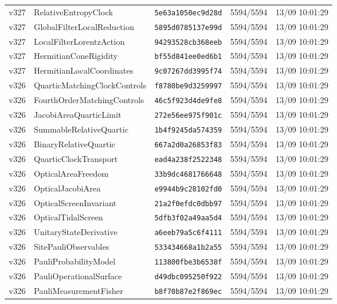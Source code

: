 \documentclass[11pt]{article}
\theoremstyle{definition}\newtheorem{deriv}{Derivation}
\begin{document}
{\begin{longtable}{@{}lllll@{}}
v327 & RelativeEntropyClock & \texttt{5e63a1050ec9d28d} & 5594/5594 & 13/09 10:01:29 \\
v327 & GlobalFilterLocalReduction & \texttt{5895d0785137e99d} & 5594/5594 & 13/09 10:01:29 \\
v327 & LocalFilterLorentzAction & \texttt{94293528cb368eeb} & 5594/5594 & 13/09 10:01:29 \\
v327 & HermitianConeRigidity & \texttt{bf55d841ee0ed6b1} & 5594/5594 & 13/09 10:01:29 \\
v327 & HermitianLocalCoordinates & \texttt{9c07267dd3995f74} & 5594/5594 & 13/09 10:01:29 \\
v326 & QuarticMatchingClockControls & \texttt{f8780be9d3259997} & 5594/5594 & 13/09 10:01:29 \\
v326 & FourthOrderMatchingControls & \texttt{46c5f923d4de9fe8} & 5594/5594 & 13/09 10:01:29 \\
v326 & JacobiAreaQuarticLimit & \texttt{272e56ee975f901c} & 5594/5594 & 13/09 10:01:29 \\
v326 & SummableRelativeQuartic & \texttt{1b4f9245da574359} & 5594/5594 & 13/09 10:01:29 \\
v326 & BinaryRelativeQuartic & \texttt{667a2d0a26853f83} & 5594/5594 & 13/09 10:01:29 \\
v326 & QuarticClockTransport & \texttt{ead4a238f2522348} & 5594/5594 & 13/09 10:01:29 \\
v326 & OpticalAreaFreedom & \texttt{33b9dc4681766648} & 5594/5594 & 13/09 10:01:29 \\
v326 & OpticalJacobiArea & \texttt{e9944b9c28102fd0} & 5594/5594 & 13/09 10:01:29 \\
v326 & OpticalScreenInvariant & \texttt{21a2f0efdc0dbb97} & 5594/5594 & 13/09 10:01:29 \\
v326 & OpticalTidalScreen & \texttt{5dfb3f02a49aa5d4} & 5594/5594 & 13/09 10:01:29 \\
v326 & UnitaryStateDerivative & \texttt{a6eeb79a5c6f4111} & 5594/5594 & 13/09 10:01:29 \\
v326 & SitePauliObservables & \texttt{533434668a1b2a55} & 5594/5594 & 13/09 10:01:29 \\
v326 & PauliProbabilityModel & \texttt{113800fbe3b6538f} & 5594/5594 & 13/09 10:01:29 \\
v326 & PauliOperationalSurface & \texttt{d49dbc095250f922} & 5594/5594 & 13/09 10:01:29 \\
v326 & PauliMeasurementFisher & \texttt{b8f70b87e2f869ec} & 5594/5594 & 13/09 10:01:29 \\

\end{longtable}}
\end{document}

